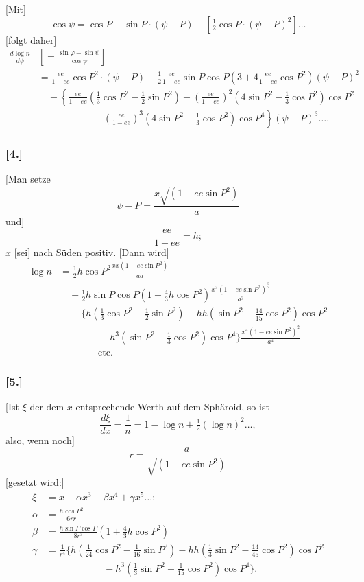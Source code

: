 \documentclass[12pt,a4paper]{article}
\theoremstyle{plain}
\theoremstyle{definition}
\theoremstyle{remark}
\newcommand{\ee}{\mathit{ee}}
\begin{document}
[Mit]
\[
\cos\psi = \cos P - \sin P\cdot(\psi - P) - [\tfrac{1}{2}\cos P\cdot(\psi - P)^2] \ldots
\]
[folgt daher]
\[
\begin{aligned}
\frac{d\log n}{d\psi} &\left[= \frac{\sin\varphi - \sin\psi}{\cos\psi}\right] \\
&= \frac{\ee}{1 - \ee}\cos P^2\cdot(\psi - P) - \tfrac{1}{2}\frac{\ee}{1 - \ee}\sin P\cos P\left(3 + 4\frac{\ee}{1 - \ee}\cos P^2\right)(\psi - P)^2 \\
&\quad - \left\{\frac{\ee}{1 - \ee}(\tfrac{1}{3}\cos P^2 - \tfrac{1}{2}\sin P^2) - \left(\frac{\ee}{1 - \ee}\right)^2(4\sin P^2 - \tfrac{1}{3}\cos P^2)\cos P^2\right. \\
&\qquad\qquad\qquad\left. - \left(\frac{\ee}{1 - \ee}\right)^3(4\sin P^2 - \tfrac{1}{3}\cos P^2)\cos P^4\right\}(\psi - P)^3 \ldots.
\end{aligned}
\]

\subsubsection*{[4.]}
[Man setze
\[
\psi - P = \frac{x\sqrt{(1 - \ee\sin P^2)}}{a}
\]
und]
\[
\frac{\ee}{1 - \ee} = h;
\]
$x$ [sei] nach Süden positiv. [Dann wird]
\[
\begin{aligned}
\log n &= \tfrac{1}{2}h\cos P^2 \frac{xx(1 - \ee\sin P^2)}{aa} \\
&\quad + \tfrac{1}{2}h\sin P\cos P(1 + \tfrac{4}{3}h\cos P^2)\frac{x^3(1 - \ee\sin P^2)^{\frac{3}{2}}}{a^3} \\
&\quad - \{h(\tfrac{1}{3}\cos P^2 - \tfrac{1}{2}\sin P^2) - hh(\sin P^2 - \tfrac{14}{15}\cos P^2)\cos P^2 \\
&\qquad\qquad - h^3(\sin P^2 - \tfrac{1}{3}\cos P^2)\cos P^4\}\frac{x^4(1 - \ee\sin P^2)^2}{a^4} \\
&\qquad\qquad\text{etc.}
\end{aligned}
\]

\subsubsection*{[5.]}
[Ist $\xi$ der dem $x$ entsprechende Werth auf dem Sphäroid, so ist
\[
\frac{d\xi}{dx} = \frac{1}{n} = 1 - \log n + \tfrac{1}{2}(\log n)^2 \ldots,
\]
also, wenn noch]
\[
r = \frac{a}{\sqrt{(1 - \ee\sin P^2)}}
\]
[gesetzt wird:]
\[
\begin{aligned}
\xi &= x - \alpha x^3 - \beta x^4 + \gamma x^5 \ldots;\\[4pt]
\alpha &= \frac{h\cos P^2}{6rr} \\
\beta &= \frac{h\sin P\cos P}{8r^3}(1 + \tfrac{4}{3}h\cos P^2) \\
\gamma &= \tfrac{1}{r^4}\{h(\tfrac{1}{24}\cos P^2 - \tfrac{1}{16}\sin P^2) - hh(\tfrac{1}{3}\sin P^2 - \tfrac{14}{45}\cos P^2)\cos P^2 \\
&\qquad\qquad\qquad - h^3(\tfrac{1}{3}\sin P^2 - \tfrac{1}{15}\cos P^2)\cos P^4\}.
\end{aligned}
\]
\end{document}
